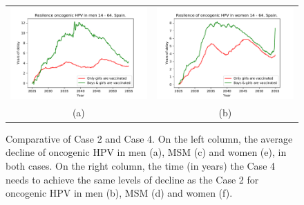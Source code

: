 \begin{figure}[!]
	\centering
	\begin{tabular}{cc}
		\includegraphics[width=0.5\linewidth]{IMGs/11.-Resilencia/compara_resilencia_onco_hom.pdf}	& 
		\includegraphics[width=0.5\linewidth]{IMGs/11.-Resilencia/compara_resilencia_onco_muj.pdf}  \\ 
		(a)	& (b) \\ 
	\end{tabular} 
	\caption{Comparative of Case 2 and Case 4. On the left column, the average decline of oncogenic HPV in men (a), MSM (c) and women (e), in both cases. On the right column, the time (in years) the Case 4 needs to achieve the same levels of decline as the Case 2 for oncogenic HPV in men (b), MSM (d) and women (f).}
	\label{fig:compara_resilencia}
\end{figure}

